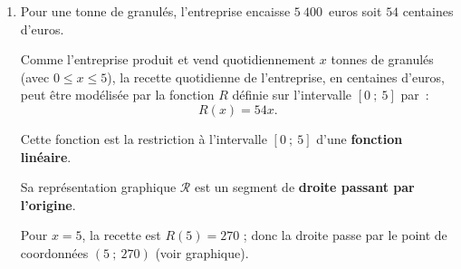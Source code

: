\begin{center}
\end{center}
%
\begin{corrige}
     \par
     \begin{enumerate}
          \item Pour une tonne de granulés, l'entreprise encaisse $5\ 400$~euros soit {$54$ centaines} d'euros.
          \par
          Comme l'entreprise produit et vend quotidiennement $x$ tonnes de granulés (avec $0 \leqslant x \leqslant 5$), la recette quotidienne de l'entreprise, en centaines d'euros, peut être modélisée par la fonction $R$ définie sur l'intervalle $[0~;~5]$ par~:
          \[ R(x)= 54x.\]
          \par
          Cette fonction est la restriction à l'intervalle $[0~;~5]$ d'une \textbf{fonction linéaire}.
          \par
          \par
          Sa représentation graphique $\mathscr{R}$ est un segment de \textbf{droite passant par l'origine}.
          \par
          Pour $x=5$, la recette est $R(5)=270$ ; donc la droite passe par le point de coordonnées $(5~;~270)$ (voir graphique).
          \begin{center}
               \begin{extern}%

\end{extern}
\end{center}
\end{enumerate}
\end{corrige}
